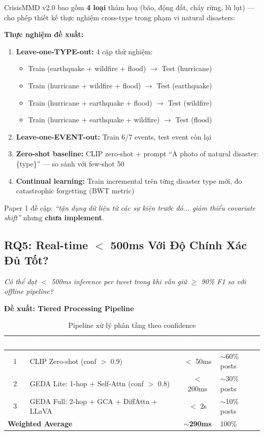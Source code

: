 \documentclass[12pt,a4paper]{article}
\begin{document}
CrisisMMD v2.0 bao gồm \textbf{4 loại} thảm hoạ (bão, động đất, cháy rừng, lũ lụt) — cho phép thiết kế thực nghiệm cross-type trong phạm vi natural disasters:

\textbf{Thực nghiệm đề xuất:}
\begin{enumerate}
  \item \textbf{Leave-one-TYPE-out:} 4 cặp thử nghiệm:
    \begin{itemize}
      \item Train (earthquake + wildfire + flood) $\rightarrow$ Test (hurricane)
      \item Train (hurricane + wildfire + flood) $\rightarrow$ Test (earthquake)
      \item Train (hurricane + earthquake + flood) $\rightarrow$ Test (wildfire)
      \item Train (hurricane + earthquake + wildfire) $\rightarrow$ Test (flood)
    \end{itemize}
  \item \textbf{Leave-one-EVENT-out:} Train 6/7 events, test event còn lại
  \item \textbf{Zero-shot baseline:} CLIP zero-shot + prompt ``A photo of natural disaster: \{type\}'' — so sánh với few-shot 50
  \item \textbf{Continual learning:} Train incremental trên từng disaster type mới, đo catastrophic forgetting (BWT metric)
\end{enumerate}

Paper 1 đề cập: \textit{``tận dụng dữ liệu từ các sự kiện trước đó... giảm thiểu covariate shift''} nhưng \textbf{chưa implement}.

\subsection{RQ5: Real-time $<$ 500ms Với Độ Chính Xác Đủ Tốt?}

\begin{noveltybox}
\textit{Có thể đạt $<$ 500ms inference per tweet trong khi vẫn giữ $\geq$ 90\% F1 so với offline pipeline?}
\end{noveltybox}

\textbf{Đề xuất: Tiered Processing Pipeline}
\begin{table}[H]
\centering
\caption{Pipeline xử lý phân tầng theo confidence}
\begin{tabularx}{\textwidth}{c l c X}
\toprule
\rowcolor{tableheader}
\textcolor{white}{\textbf{Tier}} & \textcolor{white}{\textbf{Mô tả}} & \textcolor{white}{\textbf{Latency}} & \textcolor{white}{\textbf{Traffic}} \\
\midrule
1 & CLIP Zero-shot (conf $>$ 0.9) & $<$ 50ms & $\sim$60\% posts \\
2 & GEDA Lite: 1-hop + Self-Attn (conf $>$ 0.8) & $<$ 200ms & $\sim$30\% posts \\
3 & GEDA Full: 2-hop + GCA + DiffAttn + LLaVA & $<$ 2s & $\sim$10\% posts \\
\midrule
\multicolumn{2}{l}{\textbf{Weighted Average}} & \textbf{$\sim$290ms} & 100\% \\
\bottomrule
\end{tabularx}
\end{table}
\end{document}
